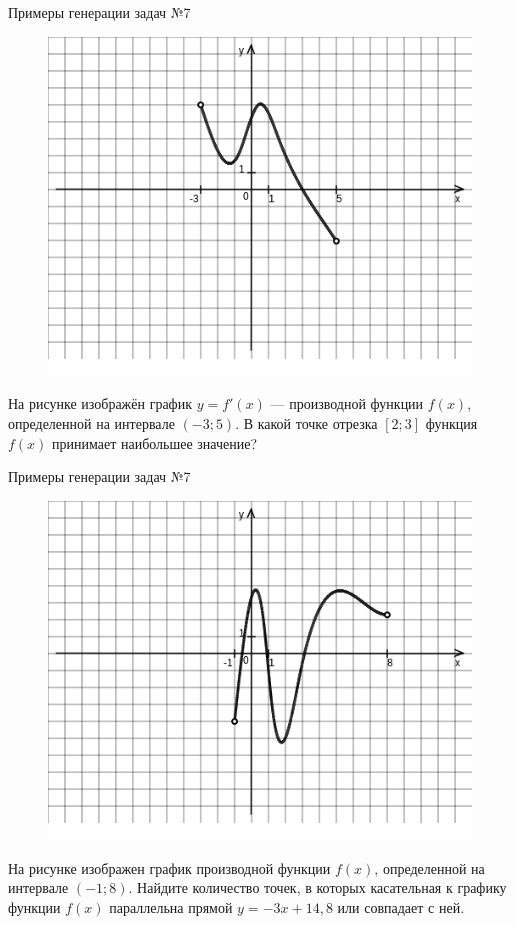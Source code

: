 \documentclass[aspectratio=169]{beamer}
\begin{document}
\begin{frame}{Примеры генерации задач №7}
    \vspace{-0.5cm}
    \begin{figure}[t]
        \includegraphics[scale=0.38]{images/9299084059373277n0}
    \end{figure}
    На рисунке изображён график $y=f'(x)$ — производной функции $f(x)$, определенной на интервале $(-3;5)$. В какой точке отрезка $[2; 3]$ функция $f(x)$ принимает наибольшее значение?
\end{frame}

\begin{frame}{Примеры генерации задач №7}
    \vspace{-0.5cm}
    \begin{figure}[t]
        \includegraphics[scale=0.38]{images/776525944899729n0}
    \end{figure}
    На рисунке изображен график производной функции $f(x)$, определенной на интервале $(-1; 8)$. Найдите количество точек, в которых касательная к графику функции $f(x)$ параллельна прямой $y=-3x+ 14{,}8 $ или совпадает с ней.
\end{frame}
\end{document}

